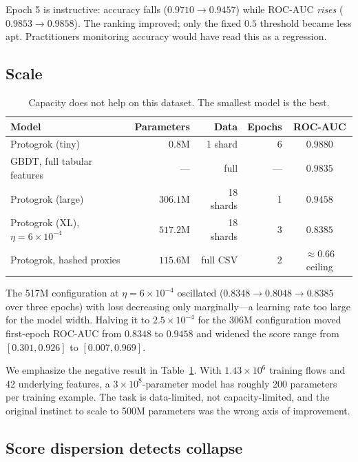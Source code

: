 \documentclass[11pt]{article}
\begin{document}
Epoch 5 is instructive: accuracy falls ($0.9710 \to 0.9457$) while ROC-AUC
\emph{rises} ($0.9853 \to 0.9858$). The ranking improved; only the fixed $0.5$
threshold became less apt. Practitioners monitoring accuracy would have read
this as a regression.

\subsection{Scale}

\begin{table}[h]
\centering
\begin{tabular}{lrrrc}
\toprule
Model & Parameters & Data & Epochs & ROC-AUC \\
\midrule
Protogrok (tiny) & $0.8$M & 1 shard & 6 & $\mathbf{0.9880}$ \\
GBDT, full tabular features & --- & full & --- & $0.9835$ \\
Protogrok (large) & $306.1$M & 18 shards & 1 & $0.9458$ \\
Protogrok (XL), $\eta = 6\!\times\!10^{-4}$ & $517.2$M & 18 shards & 3 & $0.8385$ \\
Protogrok, hashed proxies & $115.6$M & full CSV & 2 & $\approx 0.66$ ceiling \\
\bottomrule
\end{tabular}
\caption{Capacity does not help on this dataset. The smallest model is the best.}
\label{tab:scale}
\end{table}

The 517M configuration at $\eta = 6\times10^{-4}$ oscillated
($0.8348 \to 0.8048 \to 0.8385$ over three epochs) with loss decreasing only
marginally---a learning rate too large for the model width. Halving it to
$2.5\times10^{-4}$ for the 306M configuration moved first-epoch ROC-AUC from
$0.8348$ to $0.9458$ and widened the score range from $[0.301, 0.926]$ to
$[0.007, 0.969]$.

We emphasize the negative result in Table~\ref{tab:scale}. With
$1.43\times10^{6}$ training flows and 42 underlying features, a
$3\times10^{8}$-parameter model has roughly 200 parameters per training example.
The task is data-limited, not capacity-limited, and the original instinct to
scale to 500M parameters was the wrong axis of improvement.

\subsection{Score dispersion detects collapse}
\label{sec:dispersion}
\end{document}
